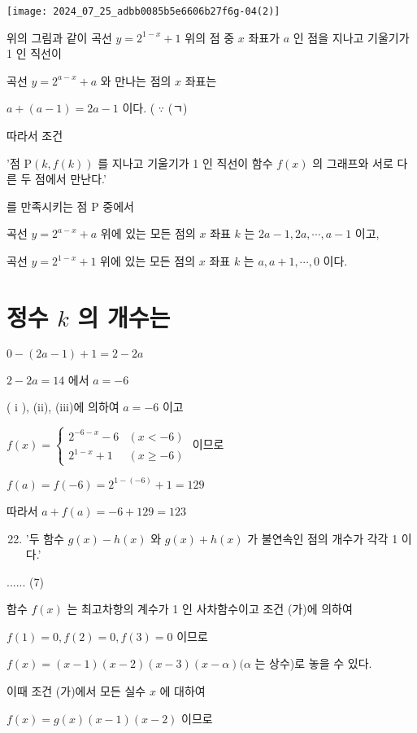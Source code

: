 \documentclass[10pt]{article}
\begin{document}
\begin{center}
\texttt{[image: 2024\_07\_25\_adbb0085b5e6606b27f6g-04(2)]}
\end{center}

위의 그림과 같이 곡선 $y=2^{1-x}+1$ 위의 점 중 $x$ 좌표가 $a$ 인 점을 지나고 기울기가 1 인 직선이

곡선 $y=2^{a-x}+a$ 와 만나는 점의 $x$ 좌표는

$a+(a-1)=2 a-1$ 이다. ( $\because$ (ㄱ)

따라서 조건

'점 $\mathrm{P}(k, f(k))$ 를 지나고 기울기가 1 인 직선이 함수 $f(x)$ 의 그래프와 서로 다른 두 점에서 만난다.'

를 만족시키는 점 P 중에서

곡선 $y=2^{a-x}+a$ 위에 있는 모든 점의 $x$ 좌표 $k$ 는 $2 a-1,2 a, \cdots, a-1$ 이고,

곡선 $y=2^{1-x}+1$ 위에 있는 모든 점의 $x$ 좌표 $k$ 는 $a, a+1, \cdots, 0$ 이다.

\section*{정수 $k$ 의 개수는}
$0-(2 a-1)+1=2-2 a$

$2-2 a=14$ 에서 $a=-6$

( i ), (ii), (iii)에 의하여 $a=-6$ 이고

$f(x)=\left\{\begin{array}{ll}2^{-6-x}-6 & (x<-6) \\ 2^{1-x}+1 & (x \geq-6)\end{array}\right.$ 이므로

$f(a)=f(-6)=2^{1-(-6)}+1=129$

따라서 $a+f(a)=-6+129=123$

\begin{enumerate}
  \setcounter{enumi}{21}
  \item '두 함수 $g(x)-h(x)$ 와 $g(x)+h(x)$ 가 불연속인 점의 개수가 각각 1 이다.'
\end{enumerate}

...... (7)

함수 $f(x)$ 는 최고차항의 계수가 1 인 사차함수이고 조건 (가)에 의하여

$f(1)=0, f(2)=0, f(3)=0$ 이므로

$f(x)=(x-1)(x-2)(x-3)(x-\alpha)(\alpha$ 는 상수)로 놓을 수 있다.

이때 조건 (가)에서 모든 실수 $x$ 에 대하여

$f(x)=g(x)(x-1)(x-2)$ 이므로
\end{document}
